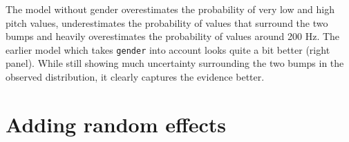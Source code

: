 \documentclass[nobib]{tufte-handout}
\begin{document}
The model without gender overestimates the probability of very low and high pitch values, underestimates the probability of values that surround the two bumps and heavily overestimates the probability of values around 200 Hz.
The earlier model which takes \texttt{gender} into account looks quite a bit better (right panel). While still showing much uncertainty surrounding the two bumps in the observed distribution, it clearly captures the evidence better. 



\section{Adding random effects}
\end{document}
